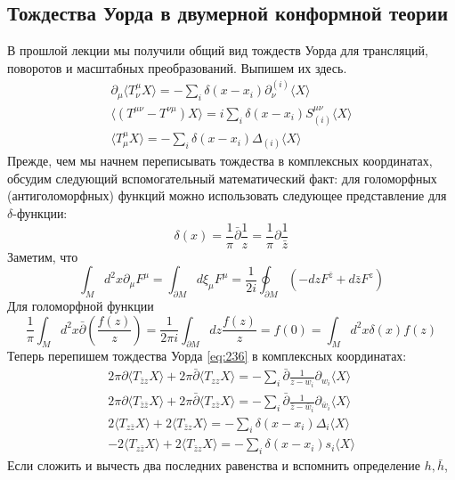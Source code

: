 \documentclass[a4paper,12pt]{article} \usepackage[utf8x]{inputenc} \usepackage[russian]{babel}
\theoremstyle{definition} \newtheorem{corollary}{Corollary}[theorem] \theoremstyle{definition}
\begin{document}
\subsection{Тождества Уорда в двумерной конформной теории}
\label{sec:ward-2d-cft} В прошлой лекции мы получили общий вид тождеств Уорда для трансляций,
поворотов и масштабных преобразований. Выпишем их здесь.
\begin{eqnarray}
  \label{eq:236}
  \partial_{\mu}\langle T^{\mu}_{\nu} X\rangle = -\sum_{i}
\delta(x-x_{i}) \partial_{\nu}^{(i)}\langle X\rangle\\ \langle (T^{\mu\nu}-T^{\nu\mu}) X\rangle
=i\sum_{i}\delta(x-x_{i}) S^{\mu\nu}_{(i)}\langle X\rangle\\ \langle T^{\mu}_{\mu}
X\rangle=-\sum_{i}\delta(x-x_{i}) \Delta_{(i)} \langle X\rangle
\end{eqnarray} Прежде, чем мы начнем переписывать тождества в комплексных координатах, обсудим
следующий вспомогательный математический факт: для голоморфных (антиголоморфных) функций можно
использовать следующее представление для $\delta$-функции:
\begin{equation}
  \label{eq:237} \delta(x)=\frac{1}{\pi} \bar \partial \frac{1}{z} = \frac{1}{\pi}\partial
\frac{1}{\bar z}
\end{equation} Заметим, что
\begin{equation}
  \label{eq:238} \int_{M} d^{2}x \partial_{\mu}F^{\mu}=\int_{\partial M} d\xi_{\mu}
F^{\mu}=\frac{1}{2i} \oint_{\partial M} (-dz F^{\bar z}+d\bar z F^{z})
\end{equation} Для голоморфной функции
\begin{equation}
  \label{eq:239} \frac{1}{\pi}\int_{M} d^{2}x \bar \partial\left(
\frac{f(z)}{z}\right)=\frac{1}{2\pi i} \int_{\partial M} dz \frac{f(z)}{z}=f(0)=\int_{M} d^{2}x
\delta(x) f(z)
\end{equation} Теперь перепишем тождества Уорда \eqref{eq:236} в комплексных координатах:
\begin{eqnarray}
  \label{eq:240} 2\pi \partial \langle T_{\bar z z } X\rangle +2\pi \bar \partial \langle
T_{zz}X\rangle = -\sum_{i} \bar \partial \frac{1}{z-w_{i}} \partial_{w_{i}} \langle X \rangle\\
2\pi \partial \langle T_{\bar z \bar z } X\rangle +2\pi \bar \partial \langle T_{z\bar z}X\rangle =
-\sum_{i} \bar \partial \frac{1}{\bar z-\bar w_{i}} \partial_{\bar w_{i}} \langle X \rangle\\ 2
\langle T_{z\bar z} X\rangle +2 \langle T_{\bar z z }X\rangle =- \sum_{i}\delta(x-x_{i}) \Delta_{i}
\langle X\rangle\\ -2 \langle T_{z\bar z} X\rangle +2 \langle T_{\bar z z }X\rangle =-
\sum_{i}\delta(x-x_{i}) s_{i} \langle X\rangle
\end{eqnarray} Если сложить и вычесть два последних равенства и вспомнить определение $h, \bar h$,
\end{document}
